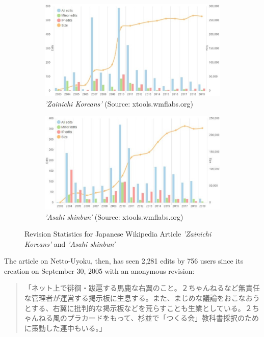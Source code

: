 \documentclass[10pt,british,A4paper,twoside]{memoir}
\begin{document}
\begin{figure}[!htb]
 \centering
 \begin{subfigure}[b]{0.49\textwidth}
 \includegraphics[width=\textwidth]{images/wiki/zainichi.jpg}
 \caption{\textit{'Zainichi Koreans'} (Source: xtools.wmflabs.org)}
 \label{fig:xtools-zainichi}
 \end{subfigure}
 \begin{subfigure}[b]{0.49\textwidth}
 \includegraphics[width=\textwidth]{images/wiki/asahi-shimbun.jpg}
 \caption{\textit{'Asahi shinbun'} (Source: xtools.wmflabs.org)}
 \label{fig:xtools-asahi}
 \end{subfigure}
 \caption{Revision Statistics for Japanese Wikipedia Article \textit{'Zainichi Koreans'} and \textit{'Asahi shinbun'}}\label{fig:xtools}
\end{figure}

The article on Netto-Uyoku, then, has seen 2,281 edits by 756 users since
its creation on September 30, 2005 with an anonymous revision:

\begin{quote}
「ネット上で徘徊・跋扈する馬鹿な右翼のこと。２ちゃんねるなど無責任な管理者が運営する掲示板に生息する。また、まじめな議論をおこなおうとする、右翼に批判的な掲示板などを荒らすことも生業としている。２ちゃんねる風のプラカードをもって、杉並で「つくる会」教科書採択のために策動した連中もいる。」
\end{quote}
\end{document}
